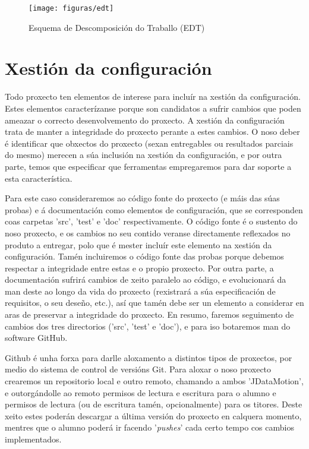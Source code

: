 \begin{figure}
\centering
\texttt{[image: figuras/edt]}
\caption{Esquema de Descomposición do Traballo (EDT)}
\label{edt}
\end{figure}

\section{Xestión da configuración}

Todo proxecto ten elementos de interese para incluír na xestión da configuración. Estes elementos caracterízanse porque son candidatos a sufrir cambios que poden ameazar o correcto desenvolvemento do proxecto. A xestión da configuración trata de manter a integridade do proxecto perante a estes cambios. O noso deber é identificar que obxectos do proxecto (sexan entregables ou resultados parciais do mesmo) merecen a súa inclusión na xestión da configuración, e por outra parte, temos que especificar que ferramentas empregaremos para dar soporte a esta característica.

Para este caso consideraremos ao código fonte do proxecto (e máis das súas probas) e á documentación como elementos de configuración, que se corresponden coas carpetas 'src', 'test' e 'doc' respectivamente. O código fonte é o sustento do noso proxecto, e os cambios no seu contido veranse directamente reflexados no produto a entregar, polo que é mester incluír este elemento na xestión da configuración. Tamén incluiremos o código fonte das probas porque debemos respectar a integridade entre estas e o propio proxecto. Por outra parte, a documentación sufrirá cambios de xeito paralelo ao código, e evolucionará da man deste ao longo da vida do proxecto (rexistrará a súa especificación de requisitos, o seu deseño, etc.), así que tamén debe ser un elemento a considerar en aras de preservar a integridade do proxecto. En resumo, faremos seguimento de cambios dos tres directorios ('src', 'test' e 'doc'), e para iso botaremos man do software GitHub\cite{github}.

Github é unha forxa para darlle aloxamento a distintos tipos de proxectos, por medio do sistema de control de versións Git. Para aloxar o noso proxecto crearemos un repositorio local e outro remoto, chamando a ambos 'JDataMotion', e outorgándolle ao remoto permisos de lectura e escritura para o alumno e permisos de lectura (ou de escritura tamén, opcionalmente) para os titores. Deste xeito estes poderán descargar a última versión do proxecto en calquera momento, mentres que o alumno poderá ir facendo '{\it pushes}' cada certo tempo cos cambios implementados.

